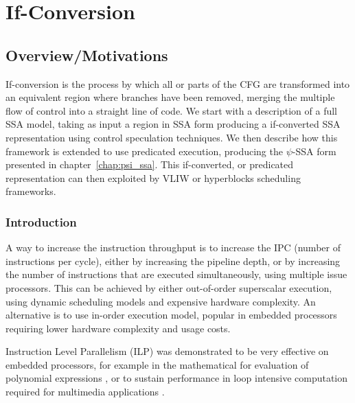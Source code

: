 \chapter{If-Conversion }\label{chap:if_conversion}
\label{chap:if_conv}
\graphicspath{{img/}{if_conversion/img/}{part4/if_conversion/img/}}
	
\newcommand\cond{~?~}


\section{Overview/Motivations}

If-conversion is the process by which all or parts of the CFG are transformed into an equivalent region where branches have been removed, merging the multiple flow of control into a straight line of code. 
We start with a description of a full SSA model, taking as input a region in SSA form producing a if-converted SSA representation using control speculation techniques. We then describe how this framework is extended to use predicated execution, producing the $\psi$-SSA form presented in chapter~\ref{chap:psi_ssa}. This if-converted, or predicated representation can then exploited by VLIW or hyperblocks scheduling frameworks.

\subsection{Introduction}

A way to increase the instruction throughput is to increase the IPC (number of instructions per cycle), either by increasing the pipeline depth, or by increasing the number of instructions that are executed simultaneously, using multiple issue processors. This can be achieved by either out-of-order superscalar execution, using dynamic scheduling models and expensive hardware complexity. An alternative is to use in-order execution model, popular in embedded processors requiring lower hardware complexity and usage costs. 

Instruction Level Parallelism (ILP) was demonstrated to be very effective on embedded processors, for example in the mathematical for evaluation of polynomial expressions \cite{Jeannerod:2010:TTI:1837210.1837212}, or to sustain performance in loop intensive computation required for multimedia applications \cite{FisherFaraboshiYoung}.

